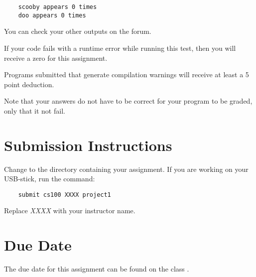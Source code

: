 \documentclass[12pt]{article}
\begin{document}
\begin{verbatim}
    scooby appears 0 times
    doo appears 0 times
\end{verbatim}

You can check your other outputs on the forum.

\color{red}
If your code fails with a runtime error while running this test,
then you will
receive a zero for this assignment.
\color{black}

Programs submitted that generate compilation warnings will receive at
least a 5 point deduction.

Note that your answers do not have to be correct for your program to be graded,
only that it not fail.

\section*{Submission Instructions}

Change to the directory containing your assignment.  If you are working
on your USB-stick, run the command:

\begin{verbatim}
    submit cs100 XXXX project1
\end{verbatim}

Replace {\it XXXX} with your instructor name.

\section*{Due Date}

The due date for this assignment can be found on the class
.
\end{document}
